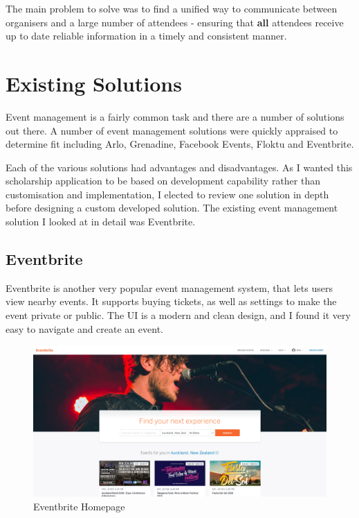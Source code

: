 \documentclass[a4paper,oneside,12pt]{report}
\begin{document}
    The main problem to solve was to find a unified way to communicate between organisers and a large number of attendees - ensuring that \textbf{all} attendees receive up to date reliable information in a timely and consistent manner.

	\section{Existing Solutions}
	Event management is a fairly common task and there are a number of solutions out there. A number of event management solutions were quickly appraised to determine fit including Arlo, Grenadine, Facebook Events, Floktu and Eventbrite. 
	
	Each of the various solutions had advantages and disadvantages. As I wanted this scholarship application to be based on development capability rather than customisation and implementation, I elected to review one solution in depth before designing a custom developed solution. The existing event management solution I looked at in detail was Eventbrite.

	\subsection{Eventbrite}
	Eventbrite is another very popular event management system, that lets users view nearby events.
	It supports buying tickets, as well as settings to make the event private or public. The UI is a modern and clean design, and I found it very easy to navigate and create an event.

	\begin{figure}[H]
		\caption{Eventbrite Homepage}
		\includegraphics[width=\linewidth]{static/eventbrite-home.png}
	\end{figure}
\end{document}
